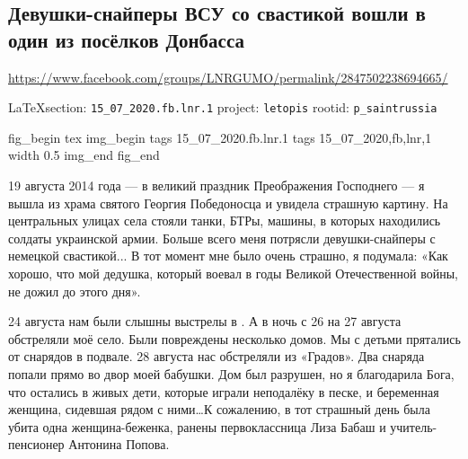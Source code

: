  
 
  
\subsection{Девушки-снайперы ВСУ со свастикой вошли в один из посёлков Донбасса}
\url{https://www.facebook.com/groups/LNRGUMO/permalink/2847502238694665/}
\label{sec:15_07_2020.fb.lnr.1}

\cite{15_07_2020.fb.lnr.1}

\vspace{0.5cm}
{\ifDEBUG\small\LaTeX section: \verb|15_07_2020.fb.lnr.1| project: \verb|letopis| rootid: \verb|p_saintrussia|\fi}
\vspace{0.5cm}

\ifcmt
fig_begin 
	tex \centering
  img_begin 
    tags 15_07_2020.fb.lnr.1
    tags 15_07_2020,fb,lnr,1
    width 0.5
  img_end
fig_end
\fi



19 августа 2014 года --- в великий праздник Преображения Господнего --- я вышла из
храма святого Георгия Победоносца и увидела страшную картину. На центральных
улицах села стояли танки, БТРы, машины, в которых находились солдаты украинской
армии. Больше всего меня потрясли девушки-снайперы с немецкой свастикой... В
тот момент мне было очень страшно, я подумала: «Как хорошо, что мой дедушка,
который воевал в годы Великой Отечественной войны, не дожил до этого дня».

24 августа нам были слышны выстрелы в . А в ночь с 26 на 27
августа обстреляли моё село. Были повреждены несколько домов. Мы с детьми
прятались от снарядов в подвале. 28 августа нас обстреляли из «Градов». Два
снаряда попали прямо во двор моей бабушки. Дом был разрушен, но я благодарила
Бога, что остались в живых дети, которые играли неподалёку в песке, и
беременная женщина, сидевшая рядом с ними\ldots К сожалению, в тот страшный день
была убита одна женщина-беженка, ранены первоклассница Лиза Бабаш и
учитель-пенсионер Антонина Попова.


